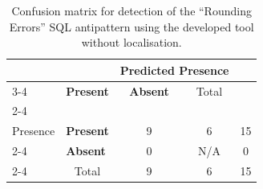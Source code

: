 \begin{table}[H]
    \centering
    \caption{Confusion matrix for detection of the “Rounding Errors” SQL antipattern using the developed tool without localisation.}
    \begin{tabular}{l|l|c|c|c}
        \multicolumn{2}{c}{}&\multicolumn{2}{c}{Predicted Presence}&\\
        \cline{3-4}
        \multicolumn{2}{c|}{}&\textbf{Present}&\textbf{Absent}&\multicolumn{1}{c}{Total}\\
        \cline{2-4}
        \multirow{2}{1.5cm}{Actual\\Presence}& \textbf{Present} & 9 & 6 & 15\\
        \cline{2-4}
        & \textbf{Absent} & 0 & N/A & 0\\
        \cline{2-4}
        \multicolumn{1}{c}{} & \multicolumn{1}{c}{Total} & \multicolumn{1}{c}{9} & \multicolumn{1}{c}{6} & \multicolumn{1}{c}{15}\\
    \end{tabular}
\end{table}
